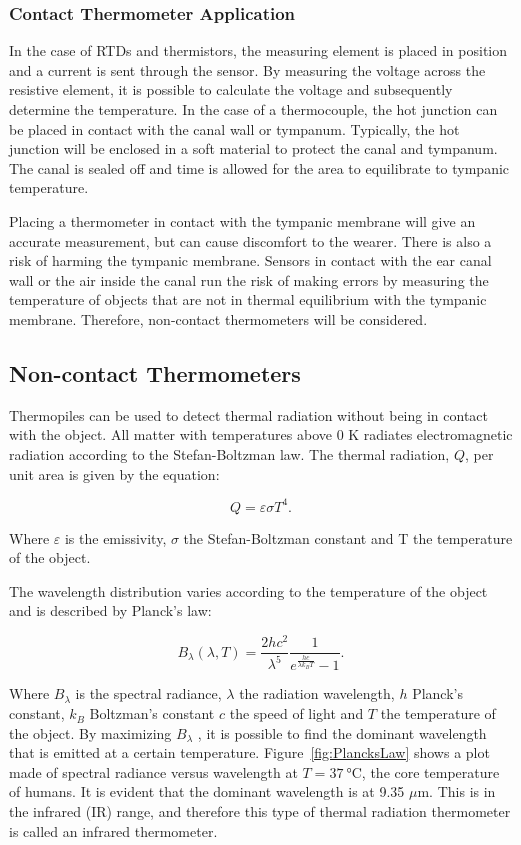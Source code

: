 \subsubsection{Contact Thermometer Application}
In the case of RTDs and thermistors, the measuring element is placed in position and a current is sent through the sensor. By measuring the voltage across the resistive element, it is possible to calculate the voltage and subsequently determine the temperature. In the case of a thermocouple, the hot junction can be placed in contact with the canal wall or tympanum. Typically, the hot junction will be enclosed in a soft material to protect the canal and tympanum. The canal is sealed off and time is allowed for the area to equilibrate to tympanic temperature.

\medskip

Placing a thermometer in contact with the tympanic membrane will give an accurate measurement, but can cause discomfort to the wearer. There is also a risk of harming the tympanic membrane. Sensors in contact with the ear canal wall or the air inside the canal run the risk of making errors by measuring the temperature of objects that are not in thermal equilibrium with the tympanic membrane. Therefore, non-contact thermometers will be considered.

\subsection{Non-contact Thermometers}
Thermopiles can be used to detect thermal radiation without being in contact with the object. All matter with temperatures above 0 K radiates electromagnetic radiation according to the Stefan-Boltzman law. The thermal radiation, $Q$, per unit area is given by the equation:

$$Q=\varepsilon \sigma T^4.$$

Where $\varepsilon$ is the emissivity, $\sigma$ the Stefan-Boltzman constant and T the temperature of the object.

The wavelength distribution varies according to the temperature of the object and is described by Planck's law:

$$B_\lambda (\lambda ,T)=\frac{2hc^2}{\lambda ^5}\frac{1}{e^\frac{hc}{\lambda k_B T} -1}.$$
 
Where $B_\lambda$ is the spectral radiance, $\lambda$ the radiation wavelength, $h$ Planck's constant, $k_B$ Boltzman's constant $c$ the speed of light and $T$ the temperature of the object. By maximizing $B_\lambda$ , it is possible to find the dominant wavelength that is emitted at a certain temperature. Figure~\ref{fig:PlancksLaw} shows a plot made of spectral radiance versus wavelength at $T=\SI{37}{\celsius}$, the core temperature of humans. It is evident that the dominant wavelength is at 9.35 $\mu$m. This is in the infrared (IR) range, and therefore this type of thermal radiation thermometer is called an infrared thermometer.

